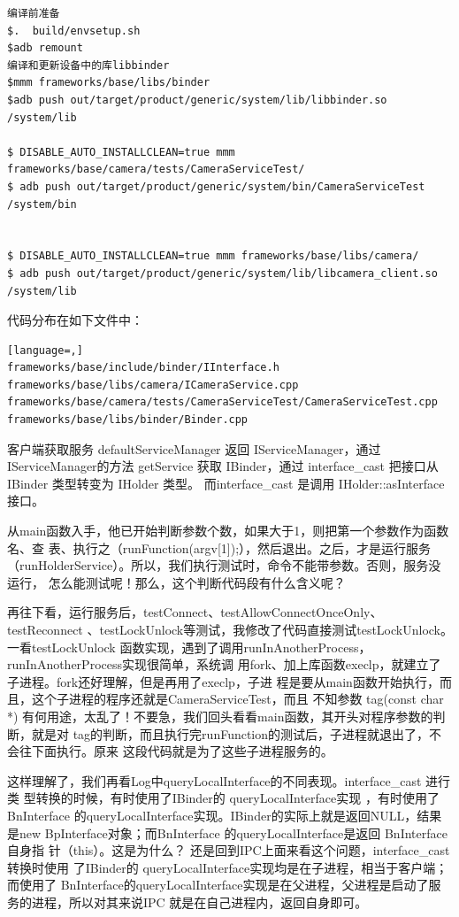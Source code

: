 \documentclass[a4paper,11pt]{article}
\begin{document}
\begin{appendices}
\begin{lstlisting}
编译前准备
$.  build/envsetup.sh
$adb remount
编译和更新设备中的库libbinder 
$mmm frameworks/base/libs/binder
$adb push out/target/product/generic/system/lib/libbinder.so  /system/lib

$ DISABLE_AUTO_INSTALLCLEAN=true mmm frameworks/base/camera/tests/CameraServiceTest/ 
$ adb push out/target/product/generic/system/bin/CameraServiceTest  /system/bin


$ DISABLE_AUTO_INSTALLCLEAN=true mmm frameworks/base/libs/camera/
$ adb push out/target/product/generic/system/lib/libcamera_client.so /system/lib
\end{lstlisting}

代码分布在如下文件中：
\begin{lstlisting}[language=,]
frameworks/base/include/binder/IInterface.h
frameworks/base/libs/camera/ICameraService.cpp
frameworks/base/camera/tests/CameraServiceTest/CameraServiceTest.cpp
frameworks/base/libs/binder/Binder.cpp
\end{lstlisting}
客户端获取服务
defaultServiceManager  返回 IServiceManager，通过 IServiceManager的方法 getService 获取 IBinder，通过 interface_cast 把接口从 IBinder 类型转变为 IHolder 类型。
而interface_cast 是调用 IHolder::asInterface 接口。

从main函数入手，他已开始判断参数个数，如果大于1，则把第一个参数作为函数名、查
表、执行之（runFunction(argv[1]);），然后退出。之后，才是运行服务
（runHolderService）。所以，我们执行测试时，命令不能带参数。否则，服务没运行，
怎么能测试呢！那么，这个判断代码段有什么含义呢？

再往下看，运行服务后，testConnect、testAllowConnectOnceOnly、testReconnect
、testLockUnlock等测试，我修改了代码直接测试testLockUnlock。一看testLockUnlock
函数实现，遇到了调用runInAnotherProcess，runInAnotherProcess实现很简单，系统调
用fork、加上库函数execlp，就建立了子进程。fork还好理解，但是再用了execlp，子进
程是要从main函数开始执行，而且，这个子进程的程序还就是CameraServiceTest，而且
不知参数 tag(const char *)
有何用途，太乱了！不要急，我们回头看看main函数，其开头对程序参数的判断，就是对
tag的判断，而且执行完runFunction的测试后，子进程就退出了，不会往下面执行。原来
这段代码就是为了这些子进程服务的。

这样理解了，我们再看Log中queryLocalInterface的不同表现。interface_cast 进行类
型转换的时候，有时使用了IBinder的 queryLocalInterface实现 ，有时使用了
BnInterface 的queryLocalInterface实现。IBinder的实际上就是返回NULL，结果是new
BpInterface对象；而BnInterface 的queryLocalInterface是返回 BnInterface 自身指
针（this）。这是为什么？ 还是回到IPC上面来看这个问题，interface_cast转换时使用
了IBinder的 queryLocalInterface实现均是在子进程，相当于客户端；而使用了
BnInterface的queryLocalInterface实现是在父进程，父进程是启动了服务的进程，所以对其来说IPC
就是在自己进程内，返回自身即可。


\end{appendices}
\end{document}
